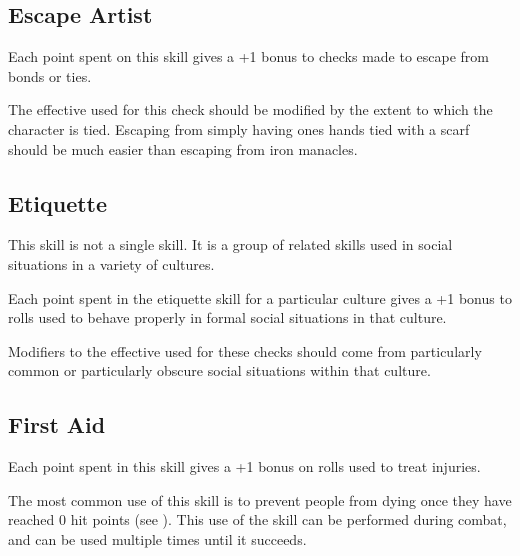\begin{multicols*}{2}

\subsection{Escape Artist}\label{skill:Escape Artist}
Each point spent on this skill gives a +1 bonus to  checks made to escape from bonds or ties.

The effective  used for this check should be modified by the extent to which the character is tied. Escaping from simply having ones hands tied with a scarf should be much easier than escaping from iron manacles.


\subsection{Etiquette}\label{skill:Etiquette}
This skill is not a single skill. It is a group of related skills used in social situations in a variety of cultures.

Each point spent in the etiquette skill for a particular culture gives a +1 bonus to  rolls used to behave properly in formal social situations in that culture.

Modifiers to the effective  used for these checks should come from particularly common or particularly obscure social situations within that culture.

\subsection{First Aid}\label{skill:First Aid}
Each point spent in this skill gives a +1 bonus on  rolls used to treat injuries.

The most common use of this skill is to prevent people from dying once they have reached 0 hit points (see ). This use of the skill can be performed during combat, and can be used multiple times until it succeeds.


\end{multicols*}
